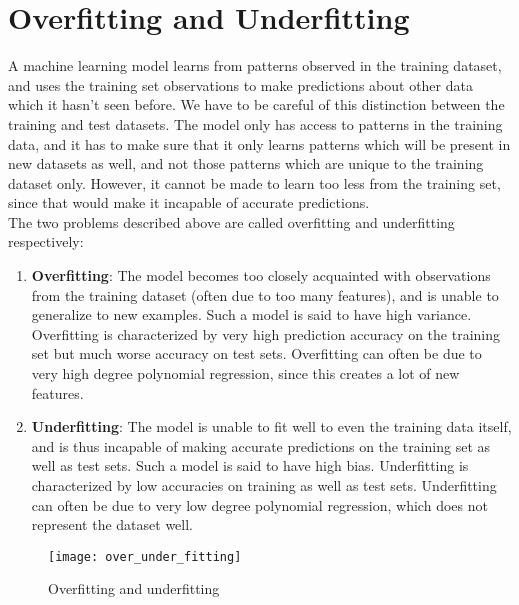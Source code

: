 \documentclass[a4paper, 12pt]{report}
\begin{document}
\chapter{Overfitting and Underfitting}
A machine learning model learns from patterns observed in the training dataset, and uses the training set observations to make predictions about other data which it hasn't seen before. We have to be careful of this distinction between the training and test datasets. The model only has access to patterns in the training data, and it has to make sure that it only learns patterns which will be present in new datasets as well, and not those patterns which are unique to the training dataset only. However, it cannot be made to learn too less from the training set, since that would make it incapable of accurate predictions. \\
\break
The two problems described above are called overfitting and underfitting respectively:
\begin{enumerate}
\item \textbf{Overfitting}: The model becomes too closely acquainted with observations from the training dataset (often due to too many features), and is unable to generalize to new examples. Such a model is said to have high variance. Overfitting is characterized by very high prediction accuracy on the training set but much worse accuracy on test sets. Overfitting can often be due to very high degree polynomial regression, since this creates a lot of new features.
\item \textbf{Underfitting}: The model is unable to fit well to even the training data itself, and is thus incapable of making accurate predictions on the training set as well as test sets. Such a model is said to have high bias. Underfitting is characterized by low accuracies on training as well as test sets. Underfitting can often be due to very low degree polynomial regression, which does not represent the dataset well.
\end{enumerate}
\begin{figure}[H]
\centering
\texttt{[image: over\_under\_fitting]}
\caption{Overfitting and underfitting}
\end{figure}
\end{document}
